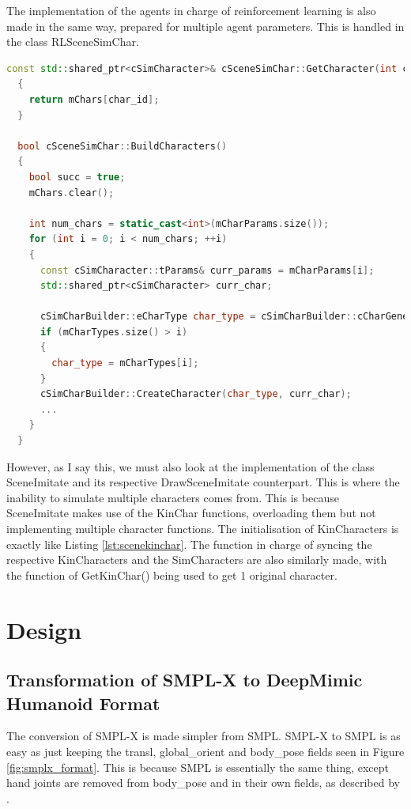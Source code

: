 \documentclass{l4proj}
\begin{document}
The implementation of the agents in charge of reinforcement learning is also made in the same way, prepared for multiple agent parameters. This is handled in the class RLSceneSimChar.

\begin{lstlisting}[language=C++, float, caption={Functions inside SceneSimChar}, label=lst:scenesimchar]
  const std::shared_ptr<cSimCharacter>& cSceneSimChar::GetCharacter(int char_id) const
  {
    return mChars[char_id];
  }

  bool cSceneSimChar::BuildCharacters()
  {
    bool succ = true;
    mChars.clear();

    int num_chars = static_cast<int>(mCharParams.size());
    for (int i = 0; i < num_chars; ++i)
    {
      const cSimCharacter::tParams& curr_params = mCharParams[i];
      std::shared_ptr<cSimCharacter> curr_char;

      cSimCharBuilder::eCharType char_type = cSimCharBuilder::cCharGeneral;
      if (mCharTypes.size() > i)
      {
        char_type = mCharTypes[i];
      }
      cSimCharBuilder::CreateCharacter(char_type, curr_char);
      ...
    }
  }    
\end{lstlisting}

However, as I say this, we must also look at the implementation of the class SceneImitate and its respective DrawSceneImitate counterpart. This is where the inability to simulate multiple characters comes from. This is because SceneImitate makes use of the KinChar functions, overloading them but not implementing multiple character functions. The initialisation of KinCharacters is exactly like Listing \ref{lst:scenekinchar}. The function in charge of syncing the respective KinCharacters and the SimCharacters are also similarly made, with the function of GetKinChar() being used to get 1 original character.

\chapter{Design}

\section{Transformation of SMPL-X to DeepMimic Humanoid Format}

The conversion of SMPL-X is made simpler from SMPL. SMPL-X to SMPL is as easy as just keeping the transl, global\_orient and body\_pose fields seen in Figure \ref{fig:smplx_format}. This is because SMPL is essentially the same thing, except hand joints are removed from body\_pose and in their own fields, as described by \cite{smplpowerpoint}.
\end{document}
